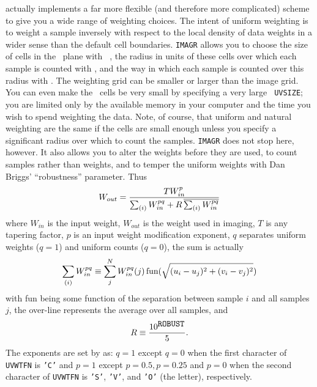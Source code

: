      {\tt {}} actually implements a far more flexible (and
therefore more complicated) scheme to give you a wide range of
weighting choices.  The intent of uniform weighting is to weight a
sample inversely with respect to the local density of data weights in
a wider sense than the default cell boundaries.  {\tt IMAGR} allows
you to choose the size of cells in the \uv\ plane with {\tt
{}}, the radius in units of these cells over which each
sample is counted with {\tt {}}, and the way in which each
sample is counted over this radius with {\tt {}}\@.  The
weighting grid can be smaller or larger than the image grid.  You can
even make the \uv\ cells be very small by specifying a very large {\tt
UVSIZE}; you are limited only by the available memory in your computer
and the time you wish to spend weighting the data.  Note, of course,
that uniform and natural weighting are the same if the cells are small
enough unless you specify a significant radius over which to count the
samples. {\tt IMAGR} does not stop here, however.  It also allows you
to alter the weights before they are used, to count samples rather
than weights, and to temper the uniform weights with Dan Briggs'
``robustness'' parameter.  Thus
$$
   W_{out} = {{T W_{in}^p}\over{\sum_{(i)}W_{in}^{pq} +
                         R\, \overline{\sum_{(i)}W_{in}^{pq}}}}
$$
where $W_{in}$ is the input weight, $W_{out}$ is the weight used in
imaging, $T$ is any tapering factor, $p$ is an input weight
modification exponent, $q$ separates uniform weights ($q = 1$) and
uniform counts ($q = 0$), the sum is actually
$$
\sum_{(i)}W_{in}^{pq} \equiv \sum_j^N W_{in}^{pq}(j)\,
         \hbox{fun}(\sqrt{(u_i-u_j)^2+(v_i-v_j)^2})
$$
with fun being some function of the separation between sample $i$ and
all samples $j$, the over-line represents the average over all samples,
and
$$
      R \equiv {{10^{\hbox{{\tt ROBUST}}}}\over 5}.
$$
The exponents are set by {\tt {}} as: $q = 1$ except $q =
0$ when the first character of {\tt UVWTFN} is {\tt 'C'} and $p = 1$
except $p = 0.5 , p = 0.25$ and $p = 0$ when the second character of
{\tt UVWTFN} is {\tt 'S'}, {\tt 'V'}, and {\tt 'O'} (the letter),
respectively.


